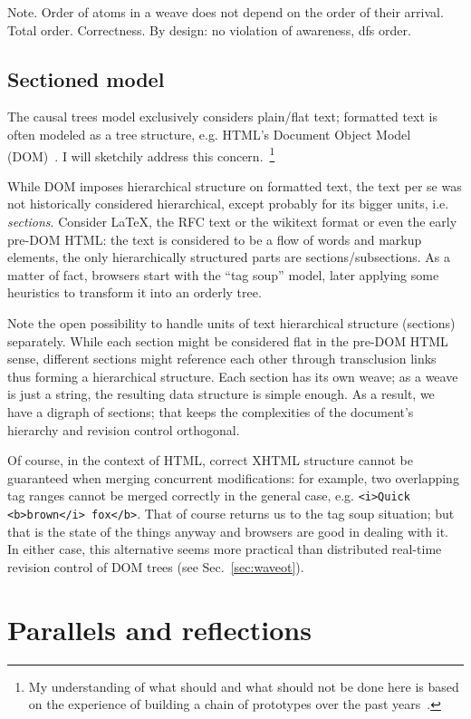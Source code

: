 \documentclass{acm_proc_article-sp}
\begin{document}
Note. Order of atoms in a weave does not depend on the order
of their arrival. Total order. Correctness.
By design: no violation of awareness, dfs order.

\subsection{Sectioned model}

The causal trees model exclusively considers plain/flat text;
formatted text is often modeled as a tree structure, e.g.
HTML's Document Object Model (DOM)~\cite{dom}. I will sketchily
address this concern.~\footnote{My understanding of what should
and what should not be done here is based on the experience of
building a chain of prototypes over the past 
years~\cite{www06,csr07,wikisym08}.} 

While DOM imposes hierarchical structure on formatted text,
the text per se was not historically considered hierarchical,
except probably for its bigger units, i.e. \emph{sections}. 
Consider LaTeX, the RFC text or the wikitext format or even the
early pre-DOM HTML: the text is considered to be a flow of
words and markup elements, the only hierarchically structured
parts are sections/subsections. As a matter of fact, browsers
start with the ``tag soup'' model, later applying some
heuristics to transform it into an orderly tree. 

Note the open possibility to handle units of text hierarchical
structure (sections) separately. While each section might
be considered flat in the pre-DOM HTML sense, different sections
might reference each other through transclusion links thus
forming a hierarchical structure. Each section has its own weave;
as a weave is just a string, the resulting data structure is
simple enough.
As a result, we have a digraph of sections;  
that keeps the complexities of the document's hierarchy and
revision control orthogonal.

Of course, in the context of HTML, correct XHTML structure cannot
be guaranteed when merging concurrent modifications: for example,
two overlapping tag ranges cannot be merged correctly in the
general case, e.g. \verb+<i>Quick <b>brown</i> fox</b>+.
That of course returns us to the tag soup situation; but that is
the state of the things anyway and  browsers are good in dealing
with it. In either case, this alternative seems more practical
than distributed real-time revision control of DOM trees
(see Sec.~\ref{sec:waveot}).


\section{Parallels and reflections}
\end{document}
